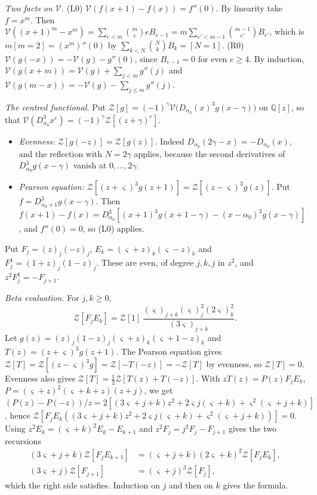 \documentclass[11pt]{amsart}
\theoremstyle{definition}
\theoremstyle{remark}
\numberwithin{equation}{section}
\newcommand{\Q}{\mathbb Q}
\begin{document}
\emph{Two facts on $\mathcal V$.} (L0) $\mathcal V(f(x+1)-f(x))=f''(0)$. By linearity take $f=x^m$. Then
$\mathcal V((x+1)^m-x^m)=\sum_{e<m}\binom me eB_{e-1}=m\sum_{e'<m-1}\binom{m-1}{e'}B_{e'}$, which is $m[m=2]=(x^m)''(0)$ by $\sum_{k<N}\binom NkB_k=[N=1]$.
(R0) $\mathcal V(g(-x))=-\mathcal V(g)-g''(0)$, since $B_{e-1}=0$ for even $e\ge4$. By induction, $\mathcal V(g(x+m))=\mathcal V(g)+\sum_{j<m}g''(j)$ and
$\mathcal V(g(m-x))=-\mathcal V(g)-\sum_{j\le m}g''(j)$.

\emph{The centred functional.} Put $\mathcal Z[g]=(-1)^\gamma\mathcal V\bigl(D_{\alpha_0}(x)^3g(x-\gamma)\bigr)$ on $\Q[z]$, so that $\mathcal V(D_{\alpha_0}^3x^e)=(-1)^\gamma\mathcal Z[(z+\gamma)^e]$.
\begin{itemize}
\item \emph{Evenness:} $\mathcal Z[g(-z)]=\mathcal Z[g(z)]$. Indeed $D_{\alpha_0}(2\gamma-x)=-D_{\alpha_0}(x)$, and the reflection with $N=2\gamma$ applies, because the second derivatives of $D_{\alpha_0}^3g(x-\gamma)$ vanish at $0,\dots,2\gamma$.
\item \emph{Pearson equation:} $\mathcal Z[(z+\varsigma)^3g(z+1)]=\mathcal Z[(z-\varsigma)^3g(z)]$. Put $f=D_{\alpha_0+1}^3g(x-\gamma)$. Then $f(x+1)-f(x)=D_{\alpha_0}^3[(x+1)^3g(x+1-\gamma)-(x-\alpha_0)^3g(x-\gamma)]$, and $f''(0)=0$, so (L0) applies.
\end{itemize}
Put $F_j=(z)_j(-z)_j$, $E_k=(\varsigma+z)_k(\varsigma-z)_k$ and $F^1_j=(1+z)_j(1-z)_j$. These are even, of degree $j,k,j$ in $z^2$, and $z^2F^1_j=-F_{j+1}$.

\emph{Beta evaluation.} For $j,k\ge0$,
\[
 \mathcal Z[F_jE_k]=\mathcal Z[1]\,\frac{(\varsigma)_{j+k}(\varsigma)_j^2(2\varsigma)_k^2}{(3\varsigma)_{j+k}} .
\]
Let $g(z)=(z)_j(1-z)_j(\varsigma+z)_k(\varsigma+1-z)_k$ and $T(z)=(z+\varsigma)^3g(z+1)$. The Pearson equation gives $\mathcal Z[T]=\mathcal Z[(z-\varsigma)^3g]=\mathcal Z[-T(-z)]=-\mathcal Z[T]$ by evenness, so $\mathcal Z[T]=0$.
Evenness also gives $\mathcal Z[T]=\frac12\mathcal Z[T(z)+T(-z)]$. With $zT(z)=P(z)F_jE_k$, $P=(\varsigma+z)^2(\varsigma+k+z)(z+j)$, we get $(P(z)-P(-z))/z=2[(3\varsigma+j+k)z^2+2\varsigma j(\varsigma+k)+\varsigma^2(\varsigma+j+k)]$, hence
$\mathcal Z[F_jE_k((3\varsigma+j+k)z^2+2\varsigma j(\varsigma+k)+\varsigma^2(\varsigma+j+k))]=0$. Using $z^2E_k=(\varsigma+k)^2E_k-E_{k+1}$ and $z^2F_j=j^2F_j-F_{j+1}$ gives the two recursions
\begin{align*}
 (3\varsigma+j+k)\mathcal Z[F_jE_{k+1}]&=(\varsigma+j+k)(2\varsigma+k)^2\mathcal Z[F_jE_k],\\
 (3\varsigma+j)\mathcal Z[F_{j+1}]&=(\varsigma+j)^3\mathcal Z[F_j],
\end{align*}
which the right side satisfies. Induction on $j$ and then on $k$ gives the formula.
\end{document}
